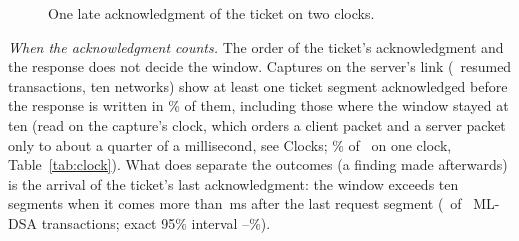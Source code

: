 \documentclass[9pt]{article}
\newcommand{\ms}{\,ms\xspace}
\begin{document}
\begin{figure}[h]
\centering
{}
\caption{One late acknowledgment of the ticket on two clocks.}
\label{fig:timeline}
\end{figure}

\emph{When the acknowledgment counts.} The order of the ticket's acknowledgment and the response does not decide the window. Captures on the server's link (\RaceN\ resumed transactions, ten networks) show at least one ticket segment acknowledged before the response is written in \RaceBeforePct\% of them, including those where the window stayed at ten (read on the capture's clock, which orders a client packet and a server packet only to about a quarter of a millisecond, see Clocks; \RpKSixPct\% of \RpKSixN\ on one clock, Table~\ref{tab:clock}). What does separate the outcomes (a finding made afterwards) is the arrival of the ticket's last acknowledgment: the window exceeds ten segments when it comes more than \RaceThr\ms after the last request segment (\RaceRight\ of \RaceMlN\ ML-DSA transactions; exact 95\% interval \CiRaceLo--\CiRaceHi\%).
\end{document}

